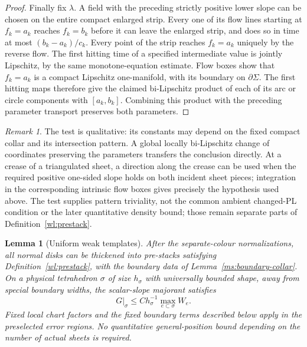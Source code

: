\documentclass[11pt]{article}
\numberwithin{equation}{section}
\newtheorem{lemma}[theorem]{Lemma}
\theoremstyle{definition}
\theoremstyle{remark}
\newtheorem{remark}[theorem]{Remark}
\begin{document}
\begin{proof}
Finally fix $\lambda$.  A field with the preceding strictly positive
lower slope can be chosen on the entire compact enlarged strip.
Every one of its flow lines starting at $f_k=a_k$ reaches
$f_k=b_k$ before it can leave the enlarged strip, and does so in
time at most $(b_k-a_k)/c_k$.  Every point of the strip reaches
$f_k=a_k$ uniquely by the reverse flow.  The first hitting time
of a specified intermediate value is jointly Lipschitz, by the same
monotone-equation estimate.  Flow boxes show that $f_k=a_k$ is a
compact Lipschitz one-manifold, with its boundary on
$\partial\Sigma$.  The first hitting maps therefore give the
claimed bi-Lipschitz product of each of its arc or circle components
with $[a_k,b_k]$.  Combining this product with the preceding
parameter transport preserves both parameters.
\end{proof}

\begin{remark}
The test is qualitative: its constants may depend on the fixed
compact collar and its intersection pattern.  A global locally
bi-Lipschitz change of coordinates preserving the parameters transfers
the conclusion directly.  At a crease of a triangulated sheet, a
direction along the crease can be used when the required positive
one-sided slope holds on both incident sheet pieces; integration in
the corresponding intrinsic flow boxes gives precisely the hypothesis
used above.  The test supplies pattern triviality, not the common
ambient changed-PL condition or the later quantitative density bound;
those remain separate parts of Definition~\ref{wl:prestack}.
\end{remark}

\begin{lemma}[Uniform weak templates]
\label{ms:weak-templates}
After the separate-colour normalizations, all normal disks can be
thickened into pre-stacks satisfying Definition~\ref{wl:prestack}, with the
boundary data of Lemma~\ref{ms:boundary-collar}.  On a physical tetrahedron
$\sigma$ of size $h_\sigma$ with universally bounded shape, away
from special boundary widths, the scalar-slope majorant satisfies
\begin{equation}
 G|_\sigma\le C h_\sigma^{-1}
                    \max_{e\subset\sigma} W_e.
 \label{ms:weak-G}
\end{equation}
Fixed local chart factors and the fixed boundary terms described
below apply in the preselected error regions.  No quantitative
general-position bound depending on the number of actual sheets is
required.
\end{lemma}
\end{document}
